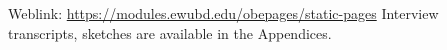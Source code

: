 \documentclass[journal,onecolumn]{IEEEtran}
\begin{document}
\vspace{\baselineskip}


Weblink: \href{https://modules.ewubd.edu/obepages/static-pages}{https://modules.ewubd.edu/obepages/static-pages}
\newline
\vspace{\baselineskip}
Interview transcripts, sketches are available in the Appendices. 

 




%






\end{document}
